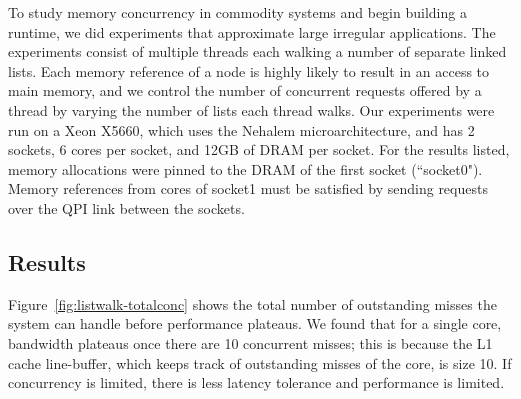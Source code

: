 

To study memory concurrency in commodity systems and begin building a runtime, we did experiments that approximate large irregular applications. The experiments consist of multiple threads each walking a number of separate linked lists. Each memory reference of a node is highly likely to result in an access to main memory, and we control the number of concurrent requests offered by a thread by varying the number of lists each thread walks.  Our experiments were run on a Xeon X5660, which uses the Nehalem microarchitecture, and has 2 sockets, 6 cores per socket, and 12GB of DRAM per socket. For the results listed, memory allocations were pinned to the DRAM of the first socket (``socket0"). Memory references from cores of socket1 must be satisfied by sending requests over the QPI link between the sockets. 
\subsection{Results}
 


	 Figure~\ref{fig:listwalk-totalconc} shows the total number of outstanding misses the system can handle before performance plateaus. We found that for a single core, bandwidth plateaus once there are 10 concurrent misses; this is because the L1 cache line-buffer, which keeps track of outstanding misses of the core, is size 10. If concurrency is limited, there is less latency tolerance and performance is limited. 

